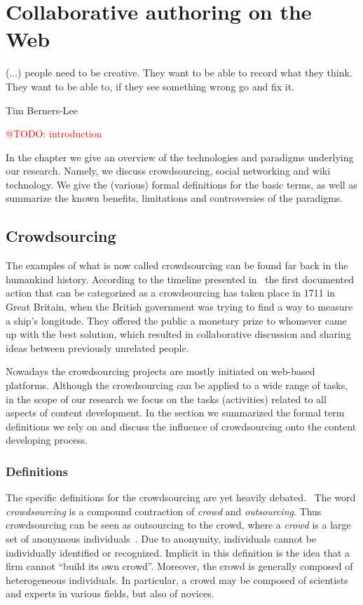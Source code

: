 \documentclass[ngerman,UKenglish,table]{scrbook}
\makeatletter
\newcommand{\todo}[1]{\textcolor{red}{@TODO: #1}}
\makeatother
\begin{document}
\chapter{Collaborative authoring on the Web}

\epigraph{(...) people need to be creative. They want to be able to record what they think. They want to be able to, if they see something wrong go and fix it.}{Tim Berners-Lee}


\todo{introduction}

In the chapter we give an overview of the technologies and paradigms underlying our research.
Namely, we discuss crowdsourcing, social networking and wiki technology.
We give the (various) formal definitions for the basic terms, as well as summarize the known benefits, limitations and controversies of the paradigms.

\section{Crowdsourcing}
The examples of what is now called crowdsourcing can be found far back in the humankind history.
According to the timeline presented in~\cite{dawson2012getting} the first documented action that can be categorized as a crowdsourcing has taken place in 1711 in Great Britain, when the British government was trying to find a way to measure a ship’s longitude.
They offered the public a monetary prize to whomever came up with the best solution, which resulted in collaborative discussion and sharing ideas between previously unrelated people.

Nowadays the crowdsourcing projects are mostly initiated on web-based platforms.
Although the crowdsourcing can be applied to a wide range of tasks, in the scope of our research we focus on the tasks (activities) related to all aspects of content development.
In the section we summarized the formal term definitions we rely on and discuss the influence of crowdsourcing onto the content developing process.


\subsection{Definitions}
\label{sec:crowdsourcing_def}
The specific definitions for the crowdsourcing are yet heavily debated.~\cite{estelles2012towards}
The word \emph{crowdsourcing} is a compound contraction of \emph{crowd} and \emph{outsourcing}.
Thus crowdsourcing can be seen as outsourcing to the crowd, where a \emph{crowd} is a large set of anonymous individuals~\cite{surowiecki2005wisdom}.
Due to anonymity, individuals cannot be individually identified or recognized. Implicit in this definition is the idea that a firm cannot “build its own crowd”. Moreover, the crowd is generally composed of heterogeneous individuals.
In particular, a crowd may be composed of scientists and experts in various fields, but also of novices.
\end{document}
